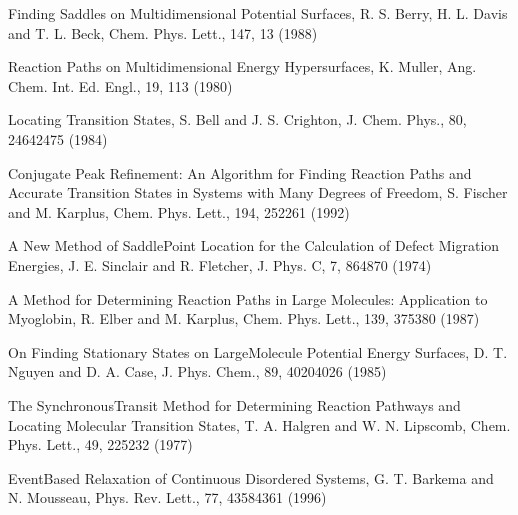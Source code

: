 \documentclass[letterpaper,11pt,english]{sphinxmanual}
\begin{document}
Finding Saddles on Multidimensional Potential Surfaces, R. S. Berry, H. L. Davis and T. L. Beck, Chem. Phys. Lett., 147, 13 (1988)

Reaction Paths on Multidimensional Energy Hypersurfaces, K. Muller, Ang. Chem. Int. Ed. Engl., 19, 1\sphinxhyphen{}13 (1980)

Locating Transition States, S. Bell and J. S. Crighton, J. Chem. Phys., 80, 2464\sphinxhyphen{}2475 (1984)

Conjugate Peak Refinement: An Algorithm for Finding Reaction Paths and Accurate Transition States in Systems with Many Degrees of Freedom, S. Fischer and M. Karplus, Chem. Phys. Lett., 194, 252\sphinxhyphen{}261 (1992)

A New Method of Saddle\sphinxhyphen{}Point Location for the Calculation of Defect Migration Energies, J. E. Sinclair and R. Fletcher, J. Phys. C, 7, 864\sphinxhyphen{}870 (1974)

A Method for Determining Reaction Paths in Large Molecules:  Application to Myoglobin, R. Elber and M. Karplus, Chem. Phys. Lett., 139, 375\sphinxhyphen{}380 (1987)

On Finding Stationary States on Large\sphinxhyphen{}Molecule Potential Energy Surfaces, D. T. Nguyen and D. A. Case, J. Phys. Chem., 89, 4020\sphinxhyphen{}4026 (1985)

The Synchronous\sphinxhyphen{}Transit Method for Determining Reaction Pathways and Locating Molecular Transition States, T. A. Halgren and W. N. Lipscomb, Chem. Phys. Lett., 49, 225\sphinxhyphen{}232 (1977)

Event\sphinxhyphen{}Based Relaxation of Continuous Disordered Systems, G. T. Barkema and N. Mousseau, Phys. Rev. Lett., 77, 4358\sphinxhyphen{}4361 (1996)



\renewcommand{\indexname}{Index}
\printindex
\end{document}
